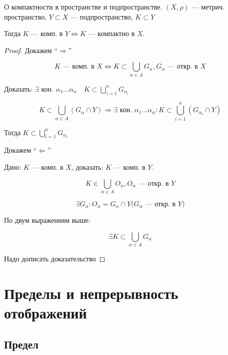\begin{theorem}
    О компактности в пространстве и подпространстве.
    $(X,\rho)$ --- метрич. пространство, $Y\subset X$ --- подпространство, $K\subset Y$

    Тогда $K$ --- комп. в $Y \Leftrightarrow K$ --- компактно в $X$.
\end{theorem}

\begin{proof}
    Докажем ``$\Rightarrow$''

    $$K\text{ --- комп. в }X \Leftrightarrow K\subset\bigcup\limits_{\alpha\in A} G_\alpha, G_\alpha\text{ --- откр. в } X$$

    Доказать: $\exists$ кон. $\alpha_1\ldots\alpha_n \quad K\subset\bigcup\limits_{i=1}^n G_{\alpha_i}$

    $$K\subset\bigcup\limits_{\alpha\in A}(G_\alpha\cap Y) \Rightarrow \exists\text{ кон. } \alpha_1\ldots\alpha_n: K\subset \bigcup\limits_{i=1}^n(G_{\alpha_i}\cap Y)$$

    Тогда $K\subset \bigcup\limits_{i=1}^n G_{\alpha_i}$

    Докажем ``$\Leftarrow$''

    Дано: $K$ --- комп. в $X$, доказать: $K$ --- комп. в $Y$.

    $$K\in\bigcup\limits_{\alpha\in A} O_\alpha, O_\alpha\text{ --- откр. в }Y$$

    $$\exists G_\alpha : O_\alpha=G_\alpha\cap Y\textit{($G_\alpha$ --- откр. в $Y$)}$$

    По двум выражениям выше:

    $$\exists K\subset \bigcup\limits_{\alpha\in A} G_\alpha$$


    Надо дописать доказательство
\end{proof}

\section{Пределы и непрерывность отображений}

\subsection{Предел}

